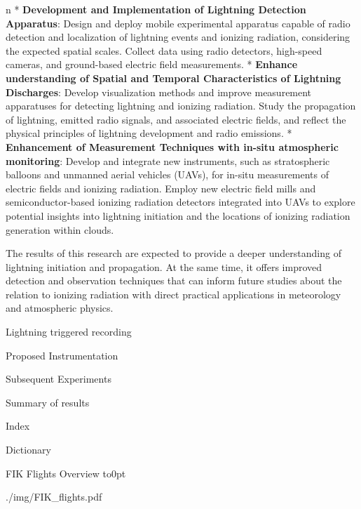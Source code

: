 \begitems \style n
* {\bf Development and Implementation of Lightning Detection Apparatus}: Design and deploy mobile experimental apparatus capable of radio detection and localization of lightning events and ionizing radiation, considering the expected spatial scales. Collect data using radio detectors, high-speed cameras, and ground-based electric field measurements.
* {\bf Enhance understanding of Spatial and Temporal Characteristics of Lightning Discharges}: Develop visualization methods and improve measurement apparatuses for detecting lightning and ionizing radiation. Study the propagation of lightning, emitted radio signals, and associated electric fields, and reflect the physical principles of lightning development and radio emissions.
* {\bf Enhancement of Measurement Techniques with in-situ atmospheric monitoring}: Develop and integrate new instruments, such as stratospheric balloons and unmanned aerial vehicles (UAVs), for in-situ measurements of electric fields and ionizing radiation. Employ new electric field mills and semiconductor-based ionizing radiation detectors integrated into UAVs to explore potential insights into lightning initiation and the locations of ionizing radiation generation within clouds.
\enditems

The results of this research are expected to provide a deeper understanding of lightning initiation and propagation. At the same time, it offers improved detection and observation techniques that can inform future studies about the relation to ionizing radiation with direct practical applications in meteorology and atmospheric physics.

 

 Lightning triggered recording 

 

\chap[instrumentation] Proposed Instrumentation

 

\chap[experiments] Subsequent Experiments

 

\chap[results] Summary of results

 

\app Index
\makeindex

\app Dictionary
\makeglos

 FIK Flights Overview
\vbox to0pt{\vskip-25mm\centerline{\inspic ./img/FIK_flights.pdf }\vss}
\nextoddpage

